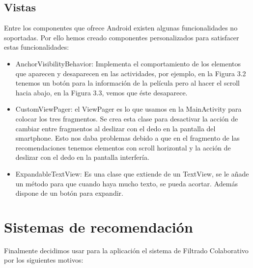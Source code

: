 \subsection{Vistas}
\label{makereference4.4.7}
Entre los componentes que ofrece Android existen algunas funcionalidades no soportadas. Por ello hemos creado componentes personalizados para satisfacer estas funcionalidades:
\begin{itemize}
    \item AnchorVisibilityBehavior: Implementa el comportamiento de los elementos que aparecen y desaparecen en las actividades, por ejemplo, en la Figura 3.2 tenemos un botón para la información de la película pero al hacer el scroll hacia abajo, en la Figura 3.3, vemos que éste desaparece.
    \item CustomViewPager: el ViewPager es lo que usamos en la MainActivity para colocar los tres fragmentos. Se crea esta clase para desactivar la acción de cambiar entre fragmentos al deslizar con el dedo en la pantalla del smartphone. Esto nos daba problemas debido a que en el fragmento de las recomendaciones tenemos elementos con scroll horizontal y la acción de deslizar con el dedo en la pantalla interfería.
    \item ExpandableTextView: Es una clase que extiende de un TextView, se le añade un método para que cuando haya mucho texto, se pueda acortar. Además dispone de un botón para expandir.
\end{itemize} 
\section{Sistemas de recomendación}
\label{makereference4.5}
Finalmente decidimos usar para la aplicación el sistema de Filtrado Colaborativo por los siguientes motivos:

